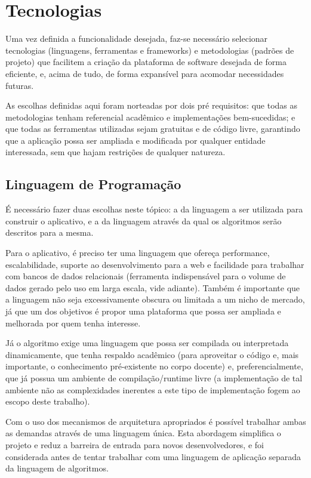 \documentclass{abnt}
\begin{document}
\section{Tecnologias}
Uma vez definida a funcionalidade desejada, faz-se necessário selecionar tecnologias (linguagens, ferramentas e frameworks) e metodologias (padrões de projeto) que facilitem a criação da plataforma de software desejada de forma eficiente, e, acima de tudo, de forma expansível para acomodar necessidades futuras.

As escolhas definidas aqui foram norteadas por dois pré requisitos: que todas as metodologias tenham referencial acadêmico e implementações bem-sucedidas; e que todas as ferramentas utilizadas sejam gratuitas e de código livre, garantindo que a aplicação  possa ser ampliada e modificada por qualquer entidade interessada, sem que hajam restrições de qualquer natureza.
\subsection{Linguagem de Programação}
É necessário fazer duas escolhas neste tópico: a da linguagem a ser utilizada para construir o aplicativo, e a da linguagem através da qual os algoritmos serão descritos para a mesma.

Para o aplicativo, é preciso ter uma linguagem que ofereça performance, escalabilidade, suporte ao desenvolvimento para a web e facilidade para trabalhar com bancos de dados relacionais (ferramenta indispensável para o volume de dados gerado pelo uso em larga escala, vide adiante). Também é importante que a linguagem não seja excessivamente obscura ou limitada a um nicho de mercado, já que um dos objetivos é propor uma plataforma que possa ser ampliada e melhorada por quem tenha interesse.

Já o algoritmo exige uma linguagem que possa ser compilada ou interpretada dinamicamente, que tenha respaldo acadêmico (para aproveitar o código e, mais importante, o conhecimento pré-existente no corpo docente) e, preferencialmente, que já possua um ambiente de compilação/runtime livre (a implementação de tal ambiente não as complexidades inerentes a este tipo de implementação fogem ao escopo deste trabalho). 

Com o uso dos mecanismos de arquitetura apropriados é possível trabalhar ambas as demandas através de uma linguagem única. Esta abordagem simplifica o projeto e reduz a barreira de entrada para novos desenvolvedores, e foi considerada antes de tentar trabalhar com uma linguagem de aplicação separada da linguagem de algoritmos.
\end{document}
